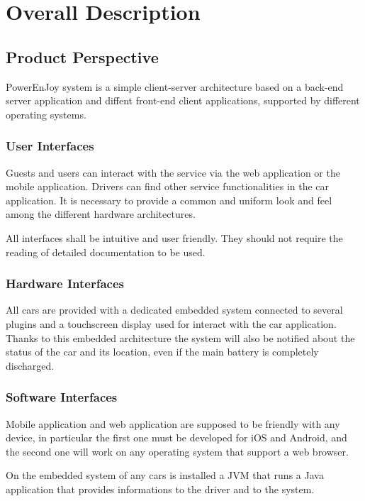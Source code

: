 \section{Overall Description}\label{sec overall-desc}

\subsection{Product Perspective}
PowerEnJoy system is a simple client-server architecture based on a back-end server application and diffent front-end client applications, supported by different operating systems.

\subsubsection{User Interfaces}
Guests and users can interact with the service via the web application or the mobile application. Drivers can find other service functionalities in the car application. It is necessary to provide a common and uniform look and feel among the different hardware architectures.

All interfaces shall be intuitive and user friendly. They should not require the reading of detailed documentation to be used.

\subsubsection{Hardware Interfaces}

All cars are provided with a dedicated embedded system connected to several plugins and a touchscreen display used for interact with the car application.
Thanks to this embedded architecture the system will also be notified about the status of the car and its location, even if the main battery is completely discharged.

\subsubsection{Software Interfaces}

Mobile application and web application are supposed to be friendly with any device, in particular the first one must be developed for iOS and Android, and the second one will work on any operating system that support a web browser.

On the embedded system of any cars is installed a JVM that runs a Java application that provides informations to the driver and to the system.

